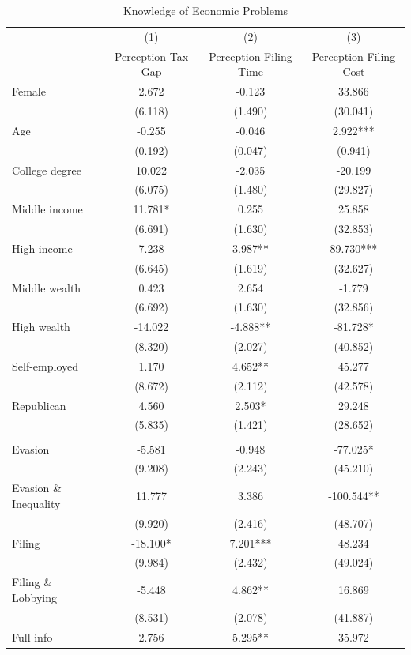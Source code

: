 \documentclass[11pt]{article}
\begin{document}
\FloatBarrier
\begin{table}[!htbp]\centering
\caption{Knowledge of Economic Problems}
\label{tab:perception_c}
\begin{threeparttable}
\footnotesize
\begin{tabular}{l|ccc}
\toprule
& (1) & (2) & (3) \\
& Perception Tax Gap & Perception Filing Time & Perception Filing Cost \\
\midrule
Female & 2.672 & -0.123 & 33.866 \\
 & (6.118) & (1.490) & (30.041) \\
Age & -0.255 & -0.046 & 2.922*** \\
 & (0.192) & (0.047) & (0.941) \\
College degree & 10.022 & -2.035 & -20.199 \\
 & (6.075) & (1.480) & (29.827) \\
Middle income & 11.781* & 0.255 & 25.858 \\
 & (6.691) & (1.630) & (32.853) \\
High income & 7.238 & 3.987** & 89.730*** \\
 & (6.645) & (1.619) & (32.627) \\
Middle wealth & 0.423 & 2.654 & -1.779 \\
 & (6.692) & (1.630) & (32.856) \\
High wealth & -14.022 & -4.888** & -81.728* \\
 & (8.320) & (2.027) & (40.852) \\
Self-employed & 1.170 & 4.652** & 45.277 \\
 & (8.672) & (2.112) & (42.578) \\
Republican & 4.560 & 2.503* & 29.248 \\
 & (5.835) & (1.421) & (28.652) \\
\\[0.5em]
Evasion & -5.581 & -0.948 & -77.025* \\
 & (9.208) & (2.243) & (45.210) \\
Evasion \& Inequality & 11.777 & 3.386 & -100.544** \\
 & (9.920) & (2.416) & (48.707) \\
Filing & -18.100* & 7.201*** & 48.234 \\
 & (9.984) & (2.432) & (49.024) \\
Filing \& Lobbying & -5.448 & 4.862** & 16.869 \\
 & (8.531) & (2.078) & (41.887) \\
Full info & 2.756 & 5.295** & 35.972 \\

\end{tabular}
\end{threeparttable}
\end{table}
\end{document}
